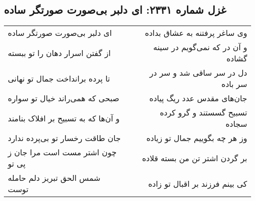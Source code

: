 \begin{center}
\section*{غزل شماره ۲۳۳۱: ای دلبر بی‌صورت صورتگر ساده}
\label{sec:2331}
\begin{longtable}{l p{0.5cm} r}
ای دلبر بی‌صورت صورتگر ساده
&&
وی ساغر پرفتنه به عشاق بداده
\\
از گفتن اسرار دهان را تو ببسته
&&
و آن در که نمی‌گویم در سینه گشاده
\\
تا پرده برانداخت جمال تو نهانی
&&
دل در سر ساقی شد و سر در سر باده
\\
صبحی که همی‌راند خیال تو سواره
&&
جان‌های مقدس عدد ریگ پیاده
\\
و آن‌ها که به تسبیح بر افلاک بنامند
&&
تسبیح گسستند و گرو کرده سجاده
\\
جان طاقت رخسار تو بی‌پرده ندارد
&&
وز هر چه بگوییم جمال تو زیاده
\\
چون اشتر مست است مرا جان ز پی تو
&&
بر گردن اشتر تن من بسته قلاده
\\
شمس الحق تبریز دلم حامله توست
&&
کی بینم فرزند بر اقبال تو زاده
\\
\end{longtable}
\end{center}

